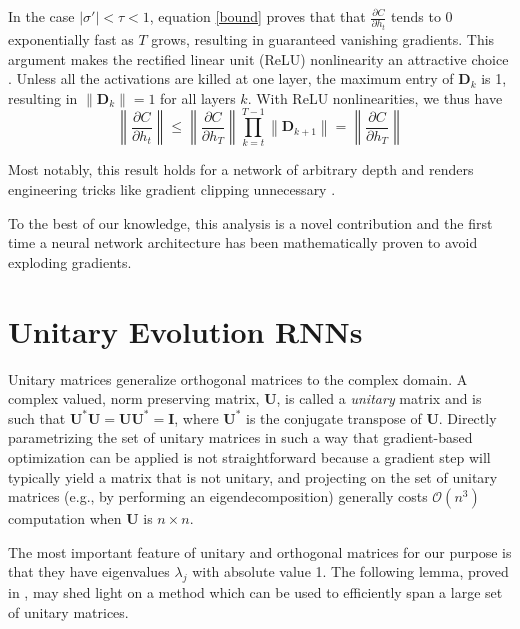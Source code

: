 \documentclass{article} %
\newcommand{\matr}[1]{\mathbf{#1}}
\newcommand\norm[1]{\left\lVert#1\right\rVert}
\begin{document}
In the case $|\sigma'| < \tau < 1$, equation \ref{bound} proves that 
that $\frac{\partial C}{\partial h_t}$ tends to 0 exponentially fast as $T$ grows, 
resulting in guaranteed vanishing gradients. 
This argument makes the rectified linear unit (ReLU) nonlinearity an attractive choice
\citep{Glorot2011, Nair2010}. Unless all the activations are killed at one layer, 
the maximum entry of $\matr{D}_k$ is 1, resulting in
$\norm{\matr{D}_k} = 1$ for all layers $k$. With ReLU nonlinearities, we thus have
\begin{equation}
  \norm{\frac{\partial C}{\partial h_t}} \leq \norm{ \frac{\partial C}{\partial h_T}} 
  \prod_{k=t}^{T-1} \norm{\matr{D}_{k+1}} = \norm{\frac{\partial C}{\partial h_T}}
\label{bound2}
\end{equation}

Most notably, this result holds for a network of arbitrary depth and renders engineering tricks
like gradient clipping unnecessary \citep{Pascanu2013}. 

To the best of our knowledge, this analysis is a novel contribution and the first time a 
neural network architecture has been mathematically proven to avoid exploding gradients. 

\vspace{-1mm}
\section{Unitary Evolution RNNs}
\label{sec:uRNN}
\vspace{-1mm}
Unitary matrices generalize orthogonal matrices to the complex domain.
A complex valued, norm preserving matrix,
$\matr{U}$, is called a \textit{unitary} matrix and is such that 
$\matr{U}^* \matr{U} = \matr{U} \matr{U}^* = \matr{I}$, where $\matr{U}^*$ is the conjugate transpose
of $\matr{U}$.  Directly parametrizing the set of unitary matrices in such a way that gradient-based
optimization can be applied is not straightforward because a gradient step will typically yield
a matrix that is not unitary, and projecting on the set of unitary matrices (e.g., by performing
an eigendecomposition) generally costs $\mathcal{O}(n^3)$ computation when $\matr{U}$ is $n \times n$.

The most important feature of unitary and orthogonal matrices for our purpose is that they have eigenvalues
$\lambda_j$ with absolute value 1. The following lemma, proved in \cite{linalgbook}, may shed light on a 
method which can be used to efficiently span a large set of unitary matrices.
\end{document}
